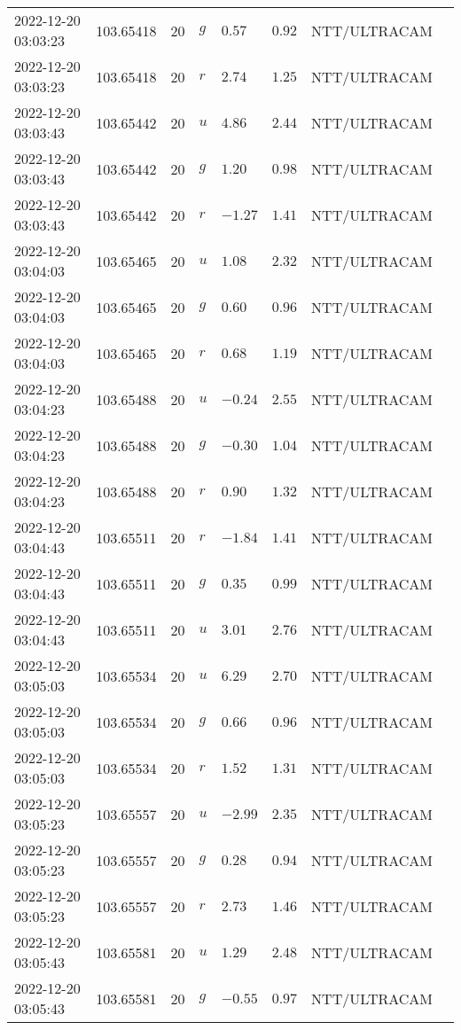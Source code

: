 \documentclass{nature_plusfigure}
\begin{document}
\begin{supplement}
\begin{center}
\begin{longtable}{llllllll}
2022-12-20 03:03:23 & 103.65418 & 20 & $g$ & $0.57$ & $0.92$ & NTT/ULTRACAM &  \\ 
2022-12-20 03:03:23 & 103.65418 & 20 & $r$ & $2.74$ & $1.25$ & NTT/ULTRACAM &  \\ 
2022-12-20 03:03:43 & 103.65442 & 20 & $u$ & $4.86$ & $2.44$ & NTT/ULTRACAM &  \\ 
2022-12-20 03:03:43 & 103.65442 & 20 & $g$ & $1.20$ & $0.98$ & NTT/ULTRACAM &  \\ 
2022-12-20 03:03:43 & 103.65442 & 20 & $r$ & $-1.27$ & $1.41$ & NTT/ULTRACAM &  \\ 
2022-12-20 03:04:03 & 103.65465 & 20 & $u$ & $1.08$ & $2.32$ & NTT/ULTRACAM &  \\ 
2022-12-20 03:04:03 & 103.65465 & 20 & $g$ & $0.60$ & $0.96$ & NTT/ULTRACAM &  \\ 
2022-12-20 03:04:03 & 103.65465 & 20 & $r$ & $0.68$ & $1.19$ & NTT/ULTRACAM &  \\ 
2022-12-20 03:04:23 & 103.65488 & 20 & $u$ & $-0.24$ & $2.55$ & NTT/ULTRACAM &  \\ 
2022-12-20 03:04:23 & 103.65488 & 20 & $g$ & $-0.30$ & $1.04$ & NTT/ULTRACAM &  \\ 
2022-12-20 03:04:23 & 103.65488 & 20 & $r$ & $0.90$ & $1.32$ & NTT/ULTRACAM &  \\ 
2022-12-20 03:04:43 & 103.65511 & 20 & $r$ & $-1.84$ & $1.41$ & NTT/ULTRACAM &  \\ 
2022-12-20 03:04:43 & 103.65511 & 20 & $g$ & $0.35$ & $0.99$ & NTT/ULTRACAM &  \\ 
2022-12-20 03:04:43 & 103.65511 & 20 & $u$ & $3.01$ & $2.76$ & NTT/ULTRACAM &  \\ 
2022-12-20 03:05:03 & 103.65534 & 20 & $u$ & $6.29$ & $2.70$ & NTT/ULTRACAM &  \\ 
2022-12-20 03:05:03 & 103.65534 & 20 & $g$ & $0.66$ & $0.96$ & NTT/ULTRACAM &  \\ 
2022-12-20 03:05:03 & 103.65534 & 20 & $r$ & $1.52$ & $1.31$ & NTT/ULTRACAM &  \\ 
2022-12-20 03:05:23 & 103.65557 & 20 & $u$ & $-2.99$ & $2.35$ & NTT/ULTRACAM &  \\ 
2022-12-20 03:05:23 & 103.65557 & 20 & $g$ & $0.28$ & $0.94$ & NTT/ULTRACAM &  \\ 
2022-12-20 03:05:23 & 103.65557 & 20 & $r$ & $2.73$ & $1.46$ & NTT/ULTRACAM &  \\ 
2022-12-20 03:05:43 & 103.65581 & 20 & $u$ & $1.29$ & $2.48$ & NTT/ULTRACAM &  \\ 
2022-12-20 03:05:43 & 103.65581 & 20 & $g$ & $-0.55$ & $0.97$ & NTT/ULTRACAM &  \\ 

\end{longtable}
\end{center}
\end{supplement}
\end{document}
